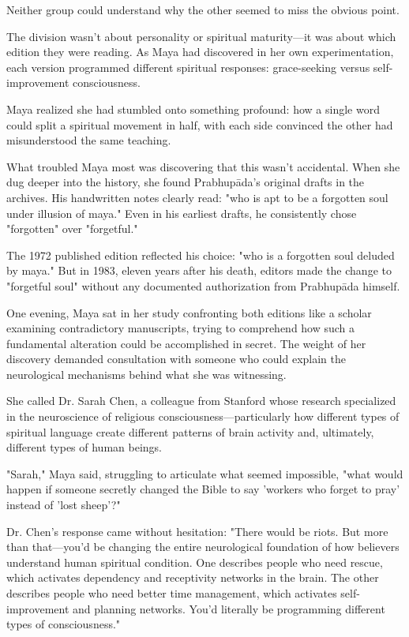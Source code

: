 \documentclass[11pt,twoside]{book}
\begin{document}
Neither group could understand why the other seemed to miss the obvious point.

The division wasn't about personality or spiritual maturity—it was about which edition they were reading. As Maya had discovered in her own experimentation, each version programmed different spiritual responses: grace-seeking versus self-improvement consciousness.

Maya realized she had stumbled onto something profound: how a single word could split a spiritual movement in half, with each side convinced the other had misunderstood the same teaching.

What troubled Maya most was discovering that this wasn't accidental. When she dug deeper into the history, she found Prabhupāda's original drafts in the archives. His handwritten notes clearly read: "who is apt to be a forgotten soul under illusion of maya." Even in his earliest drafts, he consistently chose "forgotten" over "forgetful."

The 1972 published edition reflected his choice: "who is a forgotten soul deluded by maya." But in 1983, eleven years after his death, editors made the change to "forgetful soul" without any documented authorization from Prabhupāda himself.

One evening, Maya sat in her study confronting both editions like a scholar examining contradictory manuscripts, trying to comprehend how such a fundamental alteration could be accomplished in secret. The weight of her discovery demanded consultation with someone who could explain the neurological mechanisms behind what she was witnessing.

She called Dr. Sarah Chen, a colleague from Stanford whose research specialized in the neuroscience of religious consciousness—particularly how different types of spiritual language create different patterns of brain activity and, ultimately, different types of human beings.

"Sarah," Maya said, struggling to articulate what seemed impossible, "what would happen if someone secretly changed the Bible to say 'workers who forget to pray' instead of 'lost sheep'?"

Dr. Chen's response came without hesitation: "There would be riots. But more than that—you'd be changing the entire neurological foundation of how believers understand human spiritual condition. One describes people who need rescue, which activates dependency and receptivity networks in the brain. The other describes people who need better time management, which activates self-improvement and planning networks. You'd literally be programming different types of consciousness."
\end{document}
